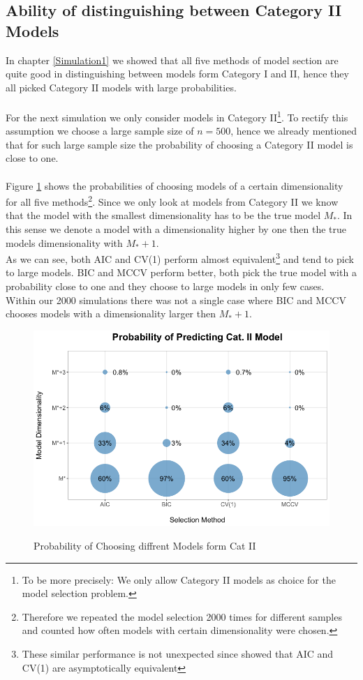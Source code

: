 \documentclass[Research_Module_ES.tex]{subfiles}
\begin{document}
\subsection{Ability of distinguishing  between Category II Models}
In chapter \ref{Simulation1} we showed that all five methods of model section are quite good in distinguishing between models form Category I and II, hence they all picked Category II models with large probabilities. \\
\\
For the next simulation we only consider models in Category II\footnote{To be more precisely: We only allow Category II models as choice for the model selection problem.}. To rectify this assumption we choose a large sample size of $n=500$, hence we already mentioned that for such large sample size the probability of choosing a Category II model is close to one.\\
\\
Figure \ref{Simulation2} shows the probabilities of choosing models of a certain dimensionality for all five methods\footnote{Therefore we repeated the model selection 2000 times for different samples and counted how often models with certain dimensionality were chosen.}. Since we only look at models from Category II we know that the model with the smallest dimensionality has to be  the true model $M_\ast$. In this sense we denote a model with a dimensionality higher by one then the true models dimensionality with $M_\ast+1$.\\
As we can see, both AIC and CV(1) perform almost equivalent\footnote{These similar performance is not unexpected since \cite{stone1977asymptotic} showed that AIC and CV(1) are asymptotically equivalent} and tend to pick to large models. BIC and MCCV  perform better, both pick the true model with a probability close to one and they choose to large models in only few cases. Within our 2000 simulations there was not a single case where BIC and MCCV chooses models with a dimensionality larger then $M_\ast+1$.
\begin{figure}[h]
	\label{Simulation2}
	\centering
	\includegraphics[width=1\textwidth]{Simulation2.png}\\
	\caption{Probability of Choosing diffrent Models form Cat II}
\end{figure}
\end{document}
